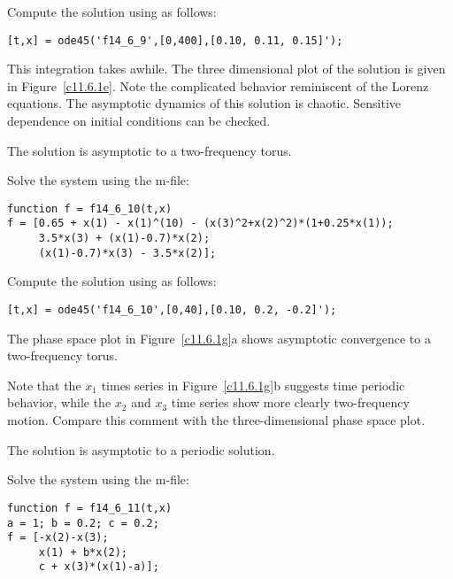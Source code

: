 \documentclass{ximera}
\begin{document}
Compute the solution using \Matlab as follows:
\begin{verbatim}
[t,x] = ode45('f14_6_9',[0,400],[0.10, 0.11, 0.15]');
\end{verbatim}
This integration takes awhile.  The three dimensional plot of the
solution is given in Figure~\ref{c11.6.1e}.  Note the complicated behavior
reminiscent of the Lorenz equations.  The asymptotic dynamics of this
solution is chaotic.  Sensitive dependence on initial conditions can be
checked.

\begin{figure}[htb]
     \centerline{%
     }
\end{figure} 

 \ans The solution is asymptotic to a two-frequency torus.

\soln Solve the system using the m-file:
\begin{verbatim}
function f = f14_6_10(t,x)
f = [0.65 + x(1) - x(1)^(10) - (x(3)^2+x(2)^2)*(1+0.25*x(1)); 
     3.5*x(3) + (x(1)-0.7)*x(2); 
     (x(1)-0.7)*x(3) - 3.5*x(2)];
\end{verbatim}

Compute the solution using \Matlab as follows:
\begin{verbatim}
[t,x] = ode45('f14_6_10',[0,40],[0.10, 0.2, -0.2]');
\end{verbatim}
The phase space plot in Figure~\ref{c11.6.1g}a shows asymptotic convergence to
a two-frequency torus.

Note that the $x_1$ times series in Figure~\ref{c11.6.1g}b 
suggests time periodic behavior, while the $x_2$ and $x_3$ time series 
show more clearly two-frequency motion.  Compare this comment with the
three-dimensional phase space plot.

\begin{figure}[htb]
     \centerline{%
     }
\end{figure} 


 \ans The solution is asymptotic to a periodic solution.

\soln Solve the system using the m-file:
\begin{verbatim}
function f = f14_6_11(t,x)
a = 1; b = 0.2; c = 0.2;
f = [-x(2)-x(3); 
     x(1) + b*x(2); 
     c + x(3)*(x(1)-a)];
\end{verbatim}
\end{document}
